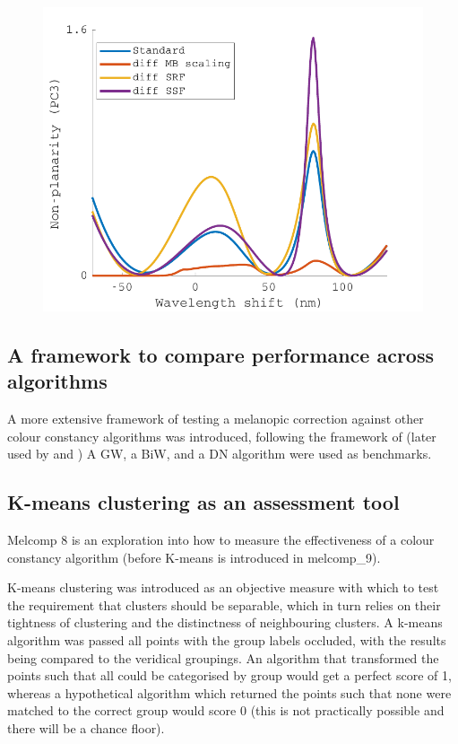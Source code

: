 \begin{figure}[htbp]
    \includegraphics[max width=\textwidth]{figs/comp/melcomp_6/PC3.pdf}
    \caption{}
    \label{fig:PC3}
\end{figure} 


\subsection{A framework to compare performance across algorithms}

A more extensive framework of testing a melanopic correction against other colour constancy algorithms was introduced, following the framework of \citet{barnard_comparison_2002} (later used by \citet{hordley_reevaluation_2006} and \citet{gijsenij_computational_2011}) A \gls{GW}, a \gls{BiW}, and a \gls{DN} algorithm were used as benchmarks.

\subsection{K-means clustering as an assessment tool}

Melcomp 8 is an exploration into how to measure the effectiveness of a colour constancy algorithm (before K-means is introduced in melcomp\_9).

K-means clustering was introduced as an objective measure with which to test the requirement that clusters should be separable, which in turn relies on their tightness of clustering and the distinctness of neighbouring clusters. A k-means algorithm was passed all points with the group labels occluded, with the results being compared to the veridical groupings. An algorithm that transformed the points such that all could be categorised by group would get a perfect score of 1, whereas a hypothetical algorithm which returned the points such that none were matched to the correct group would score 0 (this is not practically possible and there will be a chance floor).

